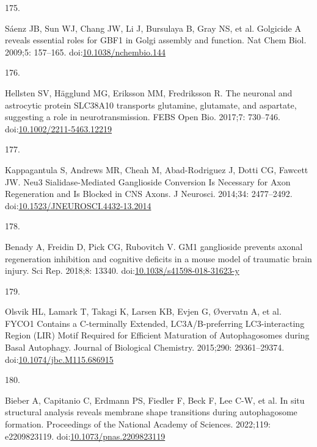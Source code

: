 \documentclass[
  12pt,
  a4paper,
]{book}
\newlength{\cslhangindent}
\newlength{\csllabelwidth}
\newlength{\cslentryspacingunit} %
\newenvironment{CSLReferences}[2] %
 {%
  \setlength{\parindent}{0pt}
  \ifodd #1
  \let\oldpar\par
  \def\par{\hangindent=\cslhangindent\oldpar}
  \fi
  \setlength{\parskip}{#2\cslentryspacingunit}
 }%
 {}
\newcommand{\CSLLeftMargin}[1]{\parbox[t]{\csllabelwidth}{#1}}
\newcommand{\CSLRightInline}[1]{\parbox[t]{\linewidth - \csllabelwidth}{#1}\break}
\begin{document}
\begin{CSLReferences}{0}{0}
\leavevmode{}%
\CSLLeftMargin{175. }%
\CSLRightInline{Sáenz JB, Sun WJ, Chang JW, Li J, Bursulaya B, Gray NS, et al. Golgicide {A} reveals essential roles for {GBF1} in {Golgi} assembly and function. Nat Chem Biol. 2009;5: 157--165. doi:\href{https://doi.org/10.1038/nchembio.144}{10.1038/nchembio.144}}

\leavevmode{}%
\CSLLeftMargin{176. }%
\CSLRightInline{Hellsten SV, Hägglund MG, Eriksson MM, Fredriksson R. The neuronal and astrocytic protein {SLC38A10} transports glutamine, glutamate, and aspartate, suggesting a role in neurotransmission. FEBS Open Bio. 2017;7: 730--746. doi:\href{https://doi.org/10.1002/2211-5463.12219}{10.1002/2211-5463.12219}}

\leavevmode{}%
\CSLLeftMargin{177. }%
\CSLRightInline{Kappagantula S, Andrews MR, Cheah M, Abad-Rodriguez J, Dotti CG, Fawcett JW. Neu3 {Sialidase-Mediated Ganglioside Conversion Is Necessary} for {Axon Regeneration} and {Is Blocked} in {CNS Axons}. J Neurosci. 2014;34: 2477--2492. doi:\href{https://doi.org/10.1523/JNEUROSCI.4432-13.2014}{10.1523/JNEUROSCI.4432-13.2014}}

\leavevmode{}%
\CSLLeftMargin{178. }%
\CSLRightInline{Benady A, Freidin D, Pick CG, Rubovitch V. {GM1} ganglioside prevents axonal regeneration inhibition and cognitive deficits in a mouse model of traumatic brain injury. Sci Rep. 2018;8: 13340. doi:\href{https://doi.org/10.1038/s41598-018-31623-y}{10.1038/s41598-018-31623-y}}

\leavevmode{}%
\CSLLeftMargin{179. }%
\CSLRightInline{Olsvik HL, Lamark T, Takagi K, Larsen KB, Evjen G, Øvervatn A, et al. {FYCO1 Contains} a {C-terminally Extended}, {LC3A}/{B-preferring LC3-interacting Region} ({LIR}) {Motif Required} for {Efficient Maturation} of {Autophagosomes} during {Basal Autophagy}. Journal of Biological Chemistry. 2015;290: 29361--29374. doi:\href{https://doi.org/10.1074/jbc.M115.686915}{10.1074/jbc.M115.686915}}

\leavevmode{}%
\CSLLeftMargin{180. }%
\CSLRightInline{Bieber A, Capitanio C, Erdmann PS, Fiedler F, Beck F, Lee C-W, et al. In situ structural analysis reveals membrane shape transitions during autophagosome formation. Proceedings of the National Academy of Sciences. 2022;119: e2209823119. doi:\href{https://doi.org/10.1073/pnas.2209823119}{10.1073/pnas.2209823119}}


\end{CSLReferences}
\end{document}
